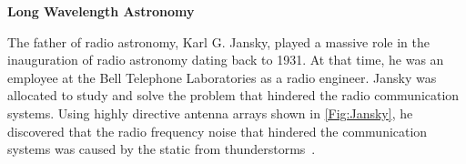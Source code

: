 \documentclass[12pt,a4paper]{report}
\begin{document}
	
%	
%	
%	
		{\bf{Long Wavelength Astronomy}}
	   
	    
	    The father of radio astronomy, Karl G. Jansky, played a massive role in the inauguration of radio astronomy dating back to 1931. At that time, he was an employee at the Bell Telephone Laboratories as a radio engineer. Jansky was allocated to study and solve the problem that hindered the radio communication systems. Using highly directive antenna arrays shown in \autoref{Fig:Jansky}, he discovered that the radio frequency noise that hindered the communication systems was caused by the static from thunderstorms~\citep{book:BasicsofRA, book:RA}.\\
	    
\end{document}
